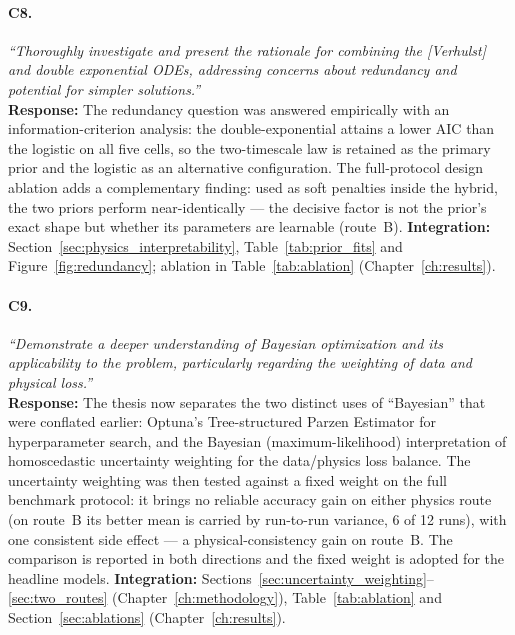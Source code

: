 \paragraph{C8.} \emph{``Thoroughly investigate and present the rationale for
combining the [Verhulst] and double exponential ODEs, addressing concerns about
redundancy and potential for simpler solutions.''}\\
\textbf{Response:} The redundancy question was answered empirically with an
information-criterion analysis: the double-exponential attains a lower AIC than
the logistic on all five cells, so the two-timescale law is retained as the
primary prior and the logistic as an alternative configuration. The
full-protocol design ablation adds a complementary finding: used as soft
penalties inside the hybrid, the two priors perform near-identically --- the
decisive factor is not the prior's exact shape but whether its parameters are
learnable (route~B).
\textbf{Integration:} Section~\ref{sec:physics_interpretability},
Table~\ref{tab:prior_fits} and Figure~\ref{fig:redundancy}; ablation in
Table~\ref{tab:ablation} (Chapter~\ref{ch:results}).

\paragraph{C9.} \emph{``Demonstrate a deeper understanding of Bayesian
optimization and its applicability to the problem, particularly regarding the
weighting of data and physical loss.''}\\
\textbf{Response:} The thesis now separates the two distinct uses of
``Bayesian'' that were conflated earlier: Optuna's Tree-structured Parzen
Estimator for hyperparameter search, and the Bayesian (maximum-likelihood)
interpretation of homoscedastic uncertainty weighting for the data/physics loss
balance. The uncertainty weighting was then tested against a fixed weight on the full
benchmark protocol: it brings no reliable accuracy gain on either physics
route (on route~B its better mean is carried by run-to-run variance, 6 of 12
runs), with one consistent side effect --- a physical-consistency gain on
route~B. The comparison is reported in both directions and the fixed weight
is adopted for the headline models.
\textbf{Integration:} Sections~\ref{sec:uncertainty_weighting}--\ref{sec:two_routes}
(Chapter~\ref{ch:methodology}),
Table~\ref{tab:ablation} and Section~\ref{sec:ablations}
(Chapter~\ref{ch:results}).

